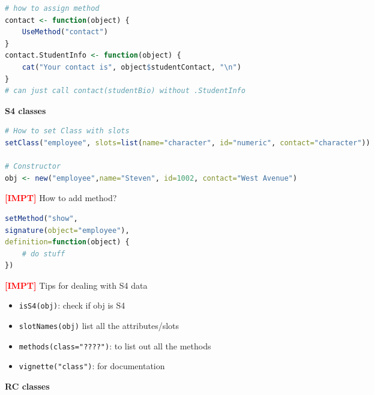 \documentclass{article}
\newcommand{\impt}[0]{\textcolor{red}{\textbf{[IMPT] }}}
\begin{document}
\begin{multicols}{2}
\begin{lstlisting}[language=R]
# how to assign method
contact <- function(object) {
	UseMethod("contact")
}
contact.StudentInfo <- function(object) {
	cat("Your contact is", object$studentContact, "\n")
}
# can just call contact(studentBio) without .StudentInfo
\end{lstlisting}
\textbf{S4 classes}
\begin{lstlisting}[language=R]
# How to set Class with slots
setClass("employee", slots=list(name="character", id="numeric", contact="character"))

# Constructor
obj <- new("employee",name="Steven", id=1002, contact="West Avenue")
\end{lstlisting}

\impt How to add method?
\begin{lstlisting}[language=R]
setMethod("show",
signature(object="employee"),
definition=function(object) {
	# do stuff
})
\end{lstlisting}

\impt Tips for dealing with S4 data
\begin{itemize}
	\item \texttt{isS4(obj)}: check if obj is S4
	\item \texttt{slotNames(obj)} list all the attributes/slots
	\item \texttt{methods(class="????")}: to list out all the methods
	\item \texttt{vignette("class")}: for documentation
\end{itemize}
\textbf{RC classes}
\end{multicols}
\end{document}

